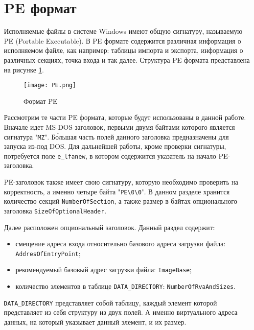 
\section{PE формат}
Исполняемые файлы в системе Windows имеют общую сигнатуру, называемую
PE (Portable Executable). В PE формате содержится различная информация о
исполняемом файле, как например: таблицы импорта и экспорта, информация о
различных секциях, точка входа и так далее. Структура PE формата представлена на
рисунке \ref{fig:PE}.
\begin{figure}[htb]
  \centering
  \texttt{[image: PE.png]}
  \caption{Формат PE}
  \label{fig:PE}
\end{figure}

Рассмотрим те части PE формата, которые будут использованы в данной работе.
Вначале идет MS-DOS заголовок, первыми двумя байтами которого является сигнатура
"\verb!MZ!". Б\'{о}льшая часть полей данного заголовка предназначены для запуска
из-под DOS. Для дальнейшей работы, кроме проверки сигнатуры, потребуется поле
\verb!e_lfanew!, в котором содержится указатель на начало PE-заголовка.

PE-заголовок также имеет свою сигнатуру, которую необходимо проверить на
корректность, а именно четыре байта "\verb!PE\0\0!". В данном разделе хранится
количество секций \verb!NumberOfSection!, а также размер в байтах опционального
заголовка \verb!SizeOfOptionalHeader!.

Далее расположен опциональный заголовок. Данный раздел содержит:
\begin{itemize}

  \item смещение адреса входа относительно базового адреса загрузки файла:
    \verb!AddresOfEntryPoint!;

  \item рекомендуемый базовый адрес загрузки файла:
    \verb!ImageBase!;

  \item количество элементов в таблице \verb!DATA_DIRECTORY!:
    \verb!NumberOfRvaAndSizes!.

\end{itemize}

\verb!DATA_DIRECTORY! представляет собой таблицу, каждый элемент которой
представляет из себя структуру из двух полей. А именно виртуального адреса
данных, на который указывает данный элемент, и их размер. 

